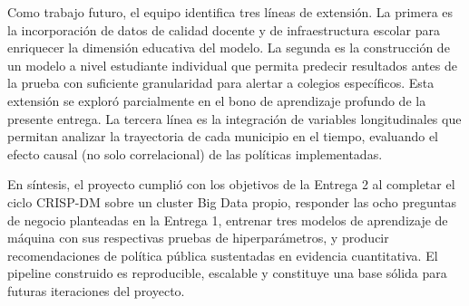 Como trabajo futuro, el equipo identifica tres líneas de extensión. La primera es la incorporación de datos de calidad docente y de infraestructura escolar para enriquecer la dimensión educativa del modelo. La segunda es la construcción de un modelo a nivel estudiante individual que permita predecir resultados antes de la prueba con suficiente granularidad para alertar a colegios específicos. Esta extensión se exploró parcialmente en el bono de aprendizaje profundo de la presente entrega. La tercera línea es la integración de variables longitudinales que permitan analizar la trayectoria de cada municipio en el tiempo, evaluando el efecto causal (no solo correlacional) de las políticas implementadas.

En síntesis, el proyecto cumplió con los objetivos de la Entrega 2 al completar el ciclo CRISP-DM sobre un cluster Big Data propio, responder las ocho preguntas de negocio planteadas en la Entrega 1, entrenar tres modelos de aprendizaje de máquina con sus respectivas pruebas de hiperparámetros, y producir recomendaciones de política pública sustentadas en evidencia cuantitativa. El pipeline construido es reproducible, escalable y constituye una base sólida para futuras iteraciones del proyecto.
